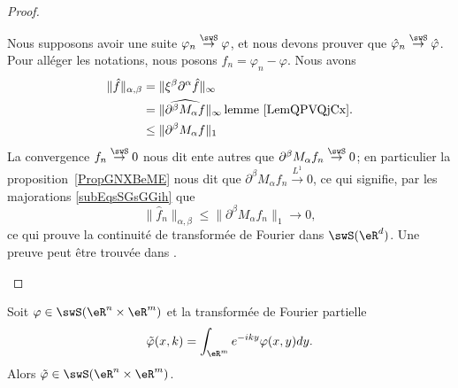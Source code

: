 \begin{proof}
\begin{subproof}
		Nous supposons avoir une suite \( \varphi_n\stackrel{\swS}{\to}\varphi\), et nous devons prouver que \( \hat\varphi_n\stackrel{\swS}{\to}\hat\varphi\). Pour alléger les notations, nous posons \( f_n=\varphi_n-\varphi\). Nous avons
		\begin{subequations}    \label{subEqsSGsGGih}
			\begin{align}
				\| \hat f \|_{\alpha,\beta} & =\| \xi^{\beta}\partial^{\alpha}\hat f \|_{\infty}                                        \\
				                            & =\| \widehat{  \partial^{\beta}M_{\alpha}f  } \|_{\infty}\,\text{lemme~\ref{LemQPVQjCx}.} \\
				                            & \leq \| \partial^{\beta}M_{\alpha}f \|_1
			\end{align}
		\end{subequations}
		La convergence \(f_n\stackrel{\swS}{\to}0\) nous dit ente autres que \( \partial^{\beta}M_{\alpha}f_n\stackrel{\swS}{\to}0\); en particulier la proposition~\ref{PropGNXBeME} nous dit que \( \partial^{\beta}M_{\alpha}f_n\stackrel{L^1}{\to}0\), ce qui signifie, par les majorations \eqref{subEqsSGsGGih} que
		\begin{equation}
			\| \hat f_n \|_{\alpha,\beta}\leq \| \partial^{\beta}M_{\alpha}f_n \|_1\to0,
		\end{equation}
		ce qui prouve la continuité de transformée de Fourier dans \( \swS(\eR^d)\).
		\spitem[Bijection]
		Une preuve peut être trouvée dans \cite{BMoNzTY}.
	\end{subproof}
\end{proof}

\begin{proposition}     \label{PROPooMVQMooGYAzSX}
	Soit \( \varphi\in\swS(\eR^n\times \eR^m)\) et la transformée de Fourier partielle
	\begin{equation}
		\tilde \varphi(x,k)=\int_{\eR^m}  e^{-iky}\varphi(x,y)dy.
	\end{equation}
	Alors \( \tilde \varphi\in\swS(\eR^n\times \eR^m  )\).
\end{proposition}

